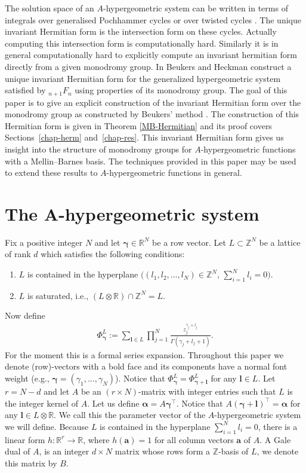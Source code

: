 \documentclass[pdftex]{sigma}
\numberwithin{equation}{section}
\begin{document}
The solution space of an $A$-hypergeometric system can be written in terms of integrals over generalised Pochhammer cycles \cite{Beu08} or over twisted cycles \cite{Kit94}. The unique invariant Hermitian form is the intersection form on these cycles. Actually computing this intersection form is computationally hard. Similarly it is in general computationally hard to explicitly compute an invariant hermitian form directly from a given monodromy group. In \cite{Beu89} Beukers and Heckman construct a unique invariant Hermitian form for the generalized hypergeometric system satisfied by ${}_{n+1}F_{n}$ using properties of its monodromy group. The goal of this paper is to give an explicit construction of the invariant Hermitian form over the monodromy group as constructed by Beukers' method \cite{Beu13}. The construction of this Hermitian form is given in Theorem \ref{MB-Hermitian} and its proof covers Sections~\ref{chap-herm} and~\ref{chap-res}. This invariant Hermitian form gives us insight into the structure of monodromy groups for $A$-hypergeometric functions with a Mellin--Barnes basis. The techniques provided in this paper may be used to extend these results to $A$-hypergeometric functions in general.

\section[The A-hypergeometric system]{The ${\boldsymbol A}$-hypergeometric system}\label{chap-ahyp}

Fix a positive integer $N$ and let $\bm{\gamma}\in\mathbb{R}^N$ be a row vector. Let $L\subset\mathbb{Z}^N$ be a lattice of
rank $d$ which satisfies the following conditions:
\begin{enumerate}\itemsep=0pt
\item $L$ is contained in the hyperplane $\big((l_1,l_2,\dots,l_N) \in \mathbb{Z}^N, \, \sum_{i=1}^Nl_i=0\big)$.
\item $L$ is saturated, i.e., $(L\otimes\mathbb{R})\cap\mathbb{Z}^N=L$.
\end{enumerate}
Now define
\begin{gather*}
\Phi_{\bm{\gamma}}^L:=\sum_{\bm{l}\in L}\prod_{j=1}^N\frac{z_j^{\gamma_j+l_j}}
{\Gamma(\gamma_j+l_j+1)}.
\end{gather*}
For the moment this is a formal series expansion. Throughout this paper we denote (row)-vectors with a bold face and its components have a normal font weight (e.g., $\bm{\gamma} = (\gamma_1,\dots,\gamma_N )$).
Notice that $\Phi_{\bm{\gamma}}^L
=\Phi_{\bm{\gamma}+\bm{l}}^L$ for any $\bm{l}\in L$.
Let $r = N-d$ and let $A$ be an $(r \times N)$-matrix with integer entries such that $L$ is
the integer kernel of $A$.
Let us define
$\bm{\alpha}=A\bm{\gamma}^\intercal$. Notice that $A(\bm{\gamma}+\bm{l})^\intercal
=\bm{\alpha}$ for any $\bm{l}\in L\otimes\mathbb{R}$.
We call this the parameter vector of the $A$-hypergeometric system we will define.
Because $L$ is contained in the hyperplane $\sum_{i=1}^Nl_i=0$, there is a linear form $h\colon \mathbb{R}^{r} \rightarrow \mathbb{R}$, where $h(\bm{a}) = 1$ for all column vectors $\bm{a}$ of $A$. A Gale dual of $A$, is an integer $d\times N$ matrix whose rows form a
$\mathbb{Z}$-basis of $L$, we denote this matrix by $B$.
\end{document}
